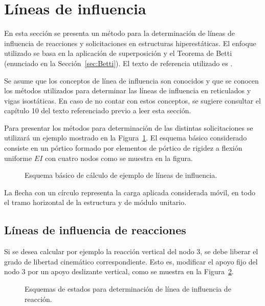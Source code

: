 \section{Líneas de influencia}

En esta sección se presenta un método para la determinación de líneas de influencia de reacciones y solicitaciones en estructuras hiperestáticas. %
%
El enfoque utilizado se basa en la aplicación de superposición y el Teorema de Betti (enunciado en la Sección~\ref{sec:Betti}).
%
El texto de referencia utilizado es \citep{Celigueta2003}.


Se asume que los conceptos de línea de influencia son conocidos y que se conocen los métodos utilizados para determinar las líneas de influencia en reticulados y vigas isostáticas. %
%
En caso de no contar con estos conceptos, se sugiere consultar el capítulo 10 del texto referenciado previo a leer esta sección.


Para presentar los métodos para determinación de las distintas solicitaciones se utilizará un ejemplo mostrado en la Figura~\ref{fig:ejemLI}. %
%
El esquema básico considerado consiste en un pórtico formado por elementos de pórtico de rigidez a flexión uniforme $EI$ con cuatro nodos como se muestra en la figura.

\begin{figure}[htb]
	\centering
	\def\svgwidth{0.65\textwidth}
  
  \caption{Esquema básico de cálculo de ejemplo de líneas de influencia.}
	\label{fig:ejemLI}
\end{figure}

La flecha con un círculo representa la carga aplicada considerada móvil, en todo el tramo horizontal de la estructura y de módulo unitario.

\subsection{Líneas de influencia de reacciones}

Si se desea calcular por ejemplo la reacción vertical del nodo 3, se debe liberar el grado de libertad cinemático correspondiente. %
%
Esto es, modificar el apoyo fijo del nodo 3 por un apoyo deslizante vertical, como se muestra en la Figura~\ref{fig:ejemLIRv3}.
%

\begin{figure}[htb]
	\centering
	\def\svgwidth{0.9\textwidth}
	
	\caption{Esquemas de estados para determinación de línea de influencia de reacción.}
	\label{fig:ejemLIRv3}
\end{figure}


